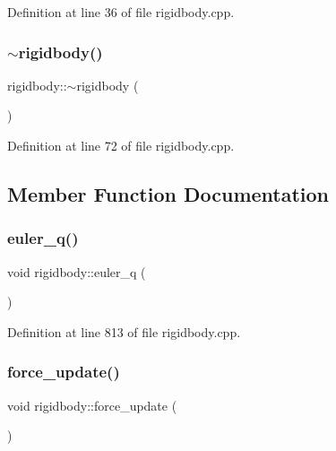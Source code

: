 Definition at line 36 of file rigidbody.\+cpp.

\mbox{\label{classrigidbody_a70821dc58b283f257e84016962f06381}} 
\subsubsection{\texorpdfstring{$\sim$rigidbody()}{~rigidbody()}}
{\footnotesize\ttfamily rigidbody\+::$\sim$rigidbody (\begin{DoxyParamCaption}{ }\end{DoxyParamCaption})}



Definition at line 72 of file rigidbody.\+cpp.



\subsection{Member Function Documentation}
\mbox{\label{classrigidbody_a0329c2b25c20317b7e869e35adc27b0a}} 
\subsubsection{\texorpdfstring{euler\+\_\+q()}{euler\_q()}}
{\footnotesize\ttfamily void rigidbody\+::euler\+\_\+q (\begin{DoxyParamCaption}{ }\end{DoxyParamCaption})}



Definition at line 813 of file rigidbody.\+cpp.

\mbox{\label{classrigidbody_a6fd9a15863ae304469f28e4ef7274058}} 
\subsubsection{\texorpdfstring{force\+\_\+update()}{force\_update()}}
{\footnotesize\ttfamily void rigidbody\+::force\+\_\+update (\begin{DoxyParamCaption}{ }\end{DoxyParamCaption})}



